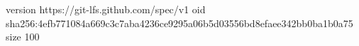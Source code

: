 version https://git-lfs.github.com/spec/v1
oid sha256:4efb771084a669c3c7aba4236ce9295a06b5d03556bd8efaee342bb0ba1b0a75
size 100
